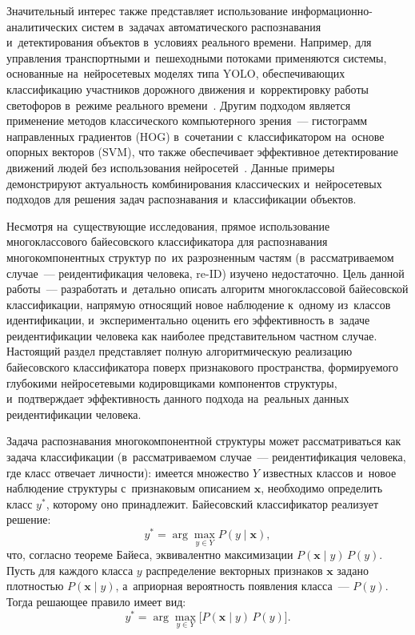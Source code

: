 Значительный интерес также представляет использование
информационно-аналитических систем в~задачах автоматического
распознавания и~детектирования объектов в~условиях реального времени.
Например, для управления транспортными и~пешеходными потоками
применяются системы, основанные на~нейросетевых моделях
типа YOLO, обеспечивающих классификацию участников дорожного движения
и~корректировку работы светофоров в~режиме реального
времени~\cite{Bobyr2024crosswalk}. Другим подходом является
применение методов классического компьютерного зрения~--- гистограмм
направленных градиентов (HOG) в~сочетании с~классификатором
на~основе опорных векторов (SVM), что также обеспечивает эффективное
детектирование движений людей без использования
нейросетей~\cite{Bobyr2024pedestrian}. Данные примеры демонстрируют
актуальность комбинирования классических и~нейросетевых подходов
для решения задач распознавания и~классификации объектов.

Несмотря на~существующие исследования, прямое использование
многоклассового байесовского классификатора для распознавания
многокомпонентных структур по~их разрозненным частям (в~рассматриваемом
случае~--- реидентификация человека, re-ID) изучено недостаточно. Цель
данной работы~--- разработать и~детально описать алгоритм многоклассовой
байесовской классификации, напрямую относящий новое наблюдение
к~одному из~классов идентификации, и~экспериментально оценить его
эффективность в~задаче реидентификации человека как наиболее
представительном частном случае.
Настоящий раздел представляет полную алгоритмическую реализацию
байесовского классификатора поверх признакового пространства,
формируемого глубокими нейросетевыми кодировщиками компонентов структуры,
и~подтверждает эффективность данного подхода на~реальных данных
реидентификации человека.

Задача распознавания многокомпонентной структуры может рассматриваться
как задача классификации (в~рассматриваемом случае~--- реидентификация
человека, где класс отвечает личности): имеется множество $Y$ известных
классов и~новое наблюдение структуры с~признаковым описанием
$\mathbf{x}$, необходимо определить класс $y^*$, которому оно принадлежит. Байесовский
классификатор реализует решение:
\begin{equation}\label{eq:ch3/bayes-decision}
    y^*=\arg\max_{y\in Y}P(y\mid\mathbf{x}),
\end{equation}
что, согласно теореме Байеса, эквивалентно максимизации
$P(\mathbf{x}\mid y)\,P(y)$. Пусть для каждого класса $y$
распределение векторных признаков $\mathbf{x}$ задано плотностью
$P(\mathbf{x}\mid y)$, а~априорная вероятность появления
класса~--- $P(y)$. Тогда решающее правило имеет вид:
\begin{equation}\label{eq:ch3/bayes-rule}
    y^*=\arg\max_{y\in Y}\bigl[P(\mathbf{x}\mid y)\,P(y)\bigr].
\end{equation}

